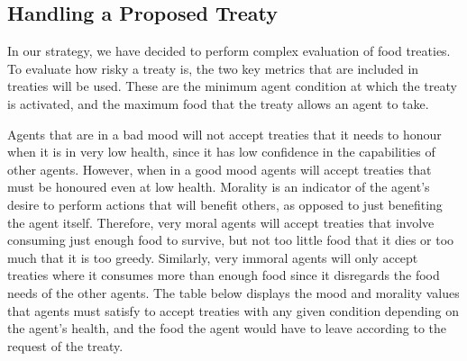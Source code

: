 \subsection{Handling a Proposed Treaty}
In our strategy, we have decided to perform complex evaluation of food treaties. To evaluate how risky a treaty is, the two key metrics that are included in treaties will be used. These are the minimum agent condition at which the treaty is activated, and the maximum food that the treaty allows an agent to take.\par
Agents that are in a bad mood will not accept treaties that it  needs to honour when it  is  in very low health, since it  has  low confidence in the capabilities of other agents. However, when in a good mood agents will accept treaties that must be honoured even at low health. Morality is an indicator of the agent’s desire to perform actions that will benefit others, as opposed to just benefiting the agent itself. Therefore, very moral agents will accept treaties that involve consuming just enough food to survive, but not too little food that it  dies or too much that it  is  too greedy. Similarly, very immoral agents will only accept treaties where it  consumes more than enough food since it  disregards the food needs of the other agents. The table below displays the mood and morality values that agents must satisfy to accept treaties with any given condition depending on the agent’s health, and the food the agent would have to leave according to the request of the treaty.
